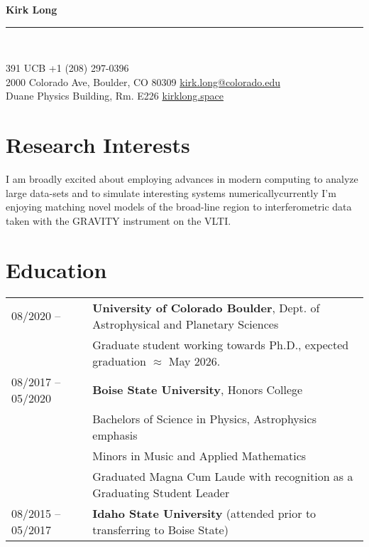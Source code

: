 \documentclass[11pt]{article}
\newcommand{\makeheading}[2]%
        {\begin{minipage}[t]{\textwidth}%
                 {\LARGE \bfseries #1} \\[-0.3\baselineskip]%
                 \rule{\columnwidth}{1.5pt}\\[0.1\baselineskip]
         \end{minipage}}
\begin{document}
\makeheading{Kirk Long}{}

391 UCB				\hfill	+1 (208) 297-0396\\
2000 Colorado Ave, Boulder, CO 80309	\hfill	\href{mailto:kirk.long@colorado.edu}{kirk.long@colorado.edu}\\
Duane Physics Building, Rm. E226			\hfill	\href{https://www.kirklong.space}{kirklong.space}



\section{Research Interests}
 I am broadly excited about employing advances in modern computing to analyze large data-sets and to simulate interesting systems numerically\textemdash currently I'm enjoying matching novel models of the broad-line region to interferometric data taken with the GRAVITY instrument on the VLTI.

\section{Education}
\begin{tabular}{ll}
08/2020 -- & \textbf{University of Colorado Boulder}, Dept. of Astrophysical and Planetary Sciences \\
          & Graduate student working towards Ph.D., expected graduation $\approx$ May 2026. \vspace{1mm}\\
08/2017 -- 05/2020	& 	\textbf{Boise State University}, Honors College \\
			&	Bachelors of Science in Physics, Astrophysics emphasis\\
			&	Minors in Music and Applied Mathematics \\
			&	Graduated Magna Cum Laude with recognition as a Graduating Student Leader \vspace{1mm}\\
08/2015 -- 05/2017 & \textbf{Idaho State University} (attended prior to transferring to Boise State)

\end{tabular}
\end{document}
